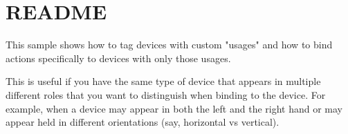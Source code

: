 \chapter{README}
\hypertarget{md__hey_tea_9_2_library_2_package_cache_2com_8unity_8inputsystem_0d1_86_83_2_samples_0i_2_custom_device_usages_2_r_e_a_d_m_e}{}\label{md__hey_tea_9_2_library_2_package_cache_2com_8unity_8inputsystem_0d1_86_83_2_samples_0i_2_custom_device_usages_2_r_e_a_d_m_e}
This sample shows how to tag devices with custom "{}usages"{} and how to bind actions specifically to devices with only those usages.

This is useful if you have the same type of device that appears in multiple different roles that you want to distinguish when binding to the device. For example, when a device may appear in both the left and the right hand or may appear held in different orientations (say, horizontal vs vertical). 